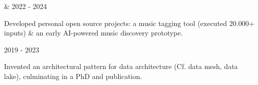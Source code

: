 

\begin{cventries}

  \cventrythin
    { \& } %
    {2022 - 2024} %
    {
          \begin{cvitems} %
	        \item {Developed personal open source projects: a music tagging tool (executed 20.000+ inputs) \& an early AI-powered music discovery prototype.}
	      \end{cvitems}
    }









  \cventrythin
    {} %
    {2019 - 2023} %
    {
          \begin{cvitems} %
			\item {Invented an architectural pattern for data architecture (Cf. data mesh, data lake), culminating in a PhD and publication.}
	      \end{cvitems}
    }



\end{cventries}
